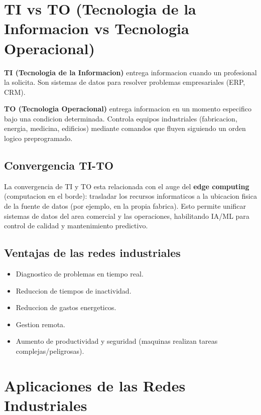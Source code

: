 \section{TI vs TO (Tecnologia de la Informacion vs Tecnologia Operacional)}

\begin{definicion}
\textbf{TI (Tecnologia de la Informacion)} entrega informacion cuando un profesional la solicita. Son sistemas de datos para resolver problemas empresariales (ERP, CRM).

\textbf{TO (Tecnologia Operacional)} entrega informacion en un momento especifico bajo una condicion determinada. Controla equipos industriales (fabricacion, energia, medicina, edificios) mediante comandos que fluyen siguiendo un orden logico preprogramado.
\end{definicion}

\subsection{Convergencia TI-TO}

La convergencia de TI y TO esta relacionada con el auge del \textbf{edge computing} (computacion en el borde): trasladar los recursos informaticos a la ubicacion fisica de la fuente de datos (por ejemplo, en la propia fabrica). Esto permite unificar sistemas de datos del area comercial y las operaciones, habilitando IA/ML para control de calidad y mantenimiento predictivo.

\subsection{Ventajas de las redes industriales}

\begin{itemize}
    \item Diagnostico de problemas en tiempo real.
    \item Reduccion de tiempos de inactividad.
    \item Reduccion de gastos energeticos.
    \item Gestion remota.
    \item Aumento de productividad y seguridad (maquinas realizan tareas complejas/peligrosas).
\end{itemize}


\section{Aplicaciones de las Redes Industriales}

